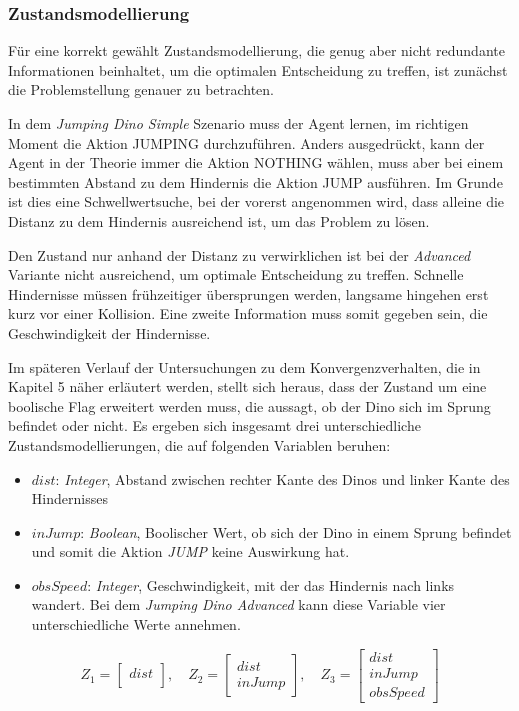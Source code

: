 \subsubsection{Zustandsmodellierung}
Für eine korrekt gewählt Zustandsmodellierung, die genug aber nicht redundante Informationen beinhaltet, um die optimalen Entscheidung zu treffen, ist zunächst die Problemstellung genauer zu betrachten. 
\par 
In dem \textit{Jumping Dino Simple} Szenario muss der Agent lernen, im richtigen Moment die Aktion JUMPING durchzuführen. Anders ausgedrückt, kann der Agent in der Theorie immer die Aktion NOTHING wählen, muss aber bei einem bestimmten Abstand zu dem Hindernis die Aktion JUMP ausführen. Im Grunde ist dies eine Schwellwertsuche, bei der vorerst angenommen wird, dass alleine die Distanz zu dem Hindernis ausreichend ist, um das Problem zu lösen.
\par 
Den Zustand nur anhand der Distanz zu verwirklichen ist bei der \textit{Advanced} Variante nicht ausreichend, um optimale Entscheidung zu treffen. Schnelle Hindernisse müssen frühzeitiger übersprungen werden, langsame hingehen erst kurz vor einer Kollision. Eine zweite Information muss somit gegeben sein, die Geschwindigkeit der Hindernisse.
\par 
Im späteren Verlauf der Untersuchungen zu dem Konvergenzverhalten, die in Kapitel 5 näher erläutert werden, stellt sich heraus, dass der Zustand um eine boolische Flag erweitert werden muss, die aussagt, ob der Dino sich im Sprung befindet oder nicht. 
Es ergeben sich insgesamt drei unterschiedliche Zustandsmodellierungen, die auf folgenden Variablen beruhen:
\begin{itemize}
 \item $dist$: \textit{Integer}, Abstand zwischen rechter Kante des Dinos und  linker Kante des Hindernisses
 \item $inJump$: \textit{Boolean}, Boolischer Wert, ob sich der Dino in einem Sprung befindet und somit die Aktion \textit{JUMP} keine Auswirkung hat.
 \item $obsSpeed$: \textit{Integer}, Geschwindigkeit, mit der das Hindernis nach links wandert. Bei dem \textit{Jumping Dino Advanced} kann diese Variable vier unterschiedliche Werte annehmen.    
\end{itemize}
\begin{equation}
    Z_{1} =  \begin{bmatrix} dist\\   \end{bmatrix}, \quad
    Z_{2} =  \begin{bmatrix} dist \\ inJump   \end{bmatrix}, \quad
    Z_{3} =  \begin{bmatrix} dist \\ inJump \\ obsSpeed   \end{bmatrix}
\end{equation}

